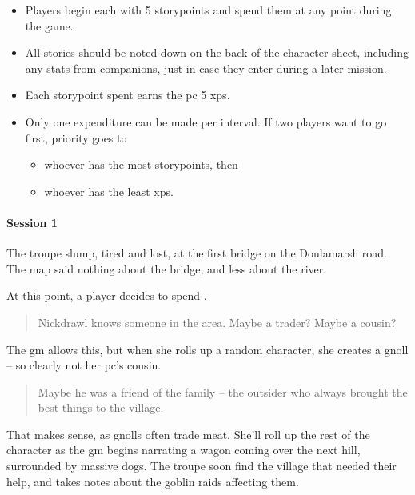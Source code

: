 \begin{multicols}{2}

\begin{itemize}
  \item
  Players begin each with 5 \glspl{storypoint} and spend them at any point during the game.
  \item
  All stories should be noted down on the back of the character sheet, including any stats from companions, just in case they enter during a later mission.
  \item
  Each \gls{storypoint} spent earns the \gls{pc} 5 \glspl{xp}.
  \item
  Only one expenditure can be made per \gls{interval}.
  If two players want to go first, priority goes to
  \begin{itemize}
    \item
    whoever has the most \glspl{storypoint}, then
    \item
    whoever has the least \glspl{xp}.
  \end{itemize}
\end{itemize}


\begin{exampletext}
  \paragraph{Session 1}
  The troupe slump, tired and lost, at the first bridge on the Doulamarsh road.
  The map said nothing about the bridge, and less about the river.

  At this point, a player decides to spend .

  \begin{quotation}
    Nickdrawl knows someone in the area.
    Maybe a trader?
    Maybe a cousin?
  \end{quotation}

  The \gls{gm} allows this, but when she rolls up a random character, she creates a gnoll -- so clearly not her \gls{pc}'s cousin.

  \begin{quotation}
    Maybe he was a friend of the family -- the outsider who always brought the best things to the village.
  \end{quotation}

  That makes sense, as gnolls often trade meat.
  She'll roll up the rest of the character as the \gls{gm} begins narrating a wagon coming over the next hill, surrounded by massive dogs.
  The troupe soon find the village that needed their help, and takes notes about the goblin raids affecting them.


\end{exampletext}
\end{multicols}
